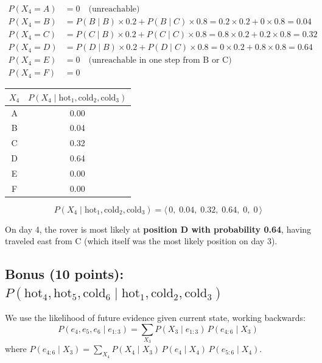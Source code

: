 \documentclass[12pt]{article}
\begin{document}
\begin{align*}
P(X_4{=}A)&=0 \quad\text{(unreachable)}\\
P(X_4{=}B)&=P(B\mid B)\times0.2+P(B\mid C)\times0.8=0.2\times0.2+0\times0.8=0.04\\
P(X_4{=}C)&=P(C\mid B)\times0.2+P(C\mid C)\times0.8=0.8\times0.2+0.2\times0.8=0.32\\
P(X_4{=}D)&=P(D\mid B)\times0.2+P(D\mid C)\times0.8=0\times0.2+0.8\times0.8=0.64\\
P(X_4{=}E)&=0 \quad\text{(unreachable in one step from B or C)}\\
P(X_4{=}F)&=0
\end{align*}

\begin{center}
\begin{tabular}{cc}
\toprule
$X_4$ & $P(X_4\mid\text{hot}_1,\text{cold}_2,\text{cold}_3)$\\
\midrule
A & 0.00\\ B & 0.04\\ C & 0.32\\ D & 0.64\\ E & 0.00\\ F & 0.00\\
\bottomrule
\end{tabular}
\end{center}
\[
\boxed{P(X_4\mid\text{hot}_1,\text{cold}_2,\text{cold}_3)
=\langle\,0,\;0.04,\;0.32,\;0.64,\;0,\;0\,\rangle}
\]

On day 4, the rover is most likely at \textbf{position D with probability 0.64},
having traveled east from C (which itself was the most likely position on day 3).

\subsection*{Bonus (10 points):
$P(\text{hot}_4,\text{hot}_5,\text{cold}_6\mid\text{hot}_1,\text{cold}_2,\text{cold}_3)$}

We use the likelihood of future evidence given current state, working backwards:
\[
P(e_4,e_5,e_6\mid e_{1:3})
=\sum_{X_3}P(X_3\mid e_{1:3})\,P(e_{4:6}\mid X_3)
\]
where $P(e_{4:6}\mid X_3)=\sum_{X_4}P(X_4\mid X_3)\,P(e_4\mid X_4)\,P(e_{5:6}\mid X_4)$.
\end{document}
